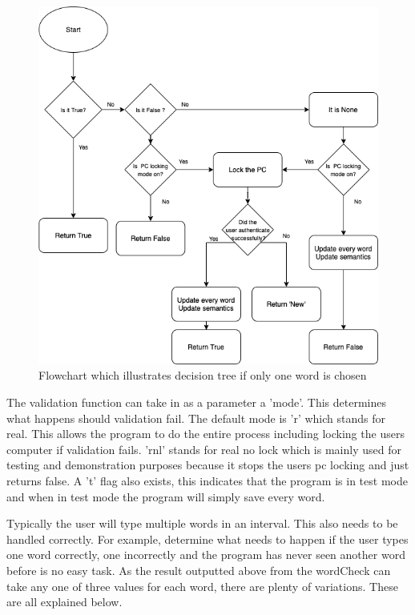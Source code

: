 \documentclass[10pt,a4paper]{report}
\begin{document}
\begin{figure}[h]
	\centering
	\includegraphics[scale=0.4]{IfLen1}
	\caption{Flowchart which illustrates decision tree if only one word is chosen}
	\label{fig:If1}
\end{figure}

The validation function can take in as a parameter a 'mode'. This determines what happens should validation fail. The default mode is 'r' which stands for real. This allows the program to do the entire process including locking the users computer if validation fails. 'rnl' stands for real no lock which is mainly used for testing and demonstration purposes because it stops the users pc locking and just returns false. A 't' flag also exists, this indicates that the program is in test mode and when in test mode the program will simply save every word.

Typically the user will type multiple words in an interval. This also needs to be handled correctly. For example, determine what needs to happen if the user types one word correctly, one incorrectly and the program has never seen another word before is no easy task. As the result outputted above from the wordCheck can take any one of three values for each word, there are plenty of variations. These are all explained below.
\end{document}
